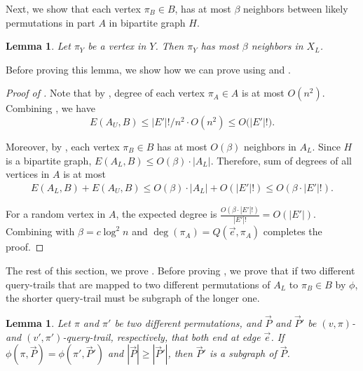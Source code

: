 \documentclass[letterpaper,11pt]{article}
\newtheorem{lemma}[theorem]{Lemma}
\begin{document}
Next, we show that each vertex $\pi_B \in B$, has at most $\beta$ neighbors between likely permutations in part $A$ in bipartite graph $H$.

\begin{lemma}\label{lem: few-likely-neighbors}
Let $\pi_Y$ be a vertex in $Y$. Then $\pi_Y$ has most $\beta$ neighbors in $X_L$. 
\end{lemma}


Before proving this lemma, we show how we can prove  using  and .

\begin{proof}[Proof of ]
Note that by , degree of each vertex $\pi_A \in A$ is at most $O(n^2)$. Combining , we have
$$E(A_U, B) \leq |E'|! / n^2 \cdot O(n^2) \leq O\big(|E'|!).$$


Moreover, by , each vertex $\pi_B \in B$ has at most $O(\beta)$ neighbors in $A_L$. Since $H$ is a bipartite graph,  $E(A_L, B) \leq O(\beta)\cdot |A_L|$. Therefore, sum of degrees of all vertices in $A$ is at most 
\begin{align*}
    E(A_L, B) + E(A_U, B) \leq O(\beta)\cdot|A_L| + O(|E'|!) \leq O(\beta\cdot|E'|!).
\end{align*}

For a random vertex in $A$, the expected degree is $\frac{O(\beta \cdot |E'|!)}{|E'|!} = O(|E'|)$. Combining with $\beta = c\log^2 n$ and $\deg(\pi_A) = Q(\vec{e},\pi_A)$ completes the proof.
\end{proof}




The rest of this section, we prove . Before proving , we prove that if two different query-trails that are mapped to two different permutations of $A_L$ to $\pi_B \in B$ by $\phi$, the shorter query-trail must be subgraph of the longer one.

\begin{lemma}\label{lem:no-branch}
Let $\pi$ and $\pi'$ be two different permutations, and $\vec{P}$ and $\vec{P}'$ be $(v,\pi)$- and $(v',\pi')$-query-trail, respectively, that both end at edge $\vec{e}$. If $\phi(\pi,\vec{P})=\phi(\pi',\vec{P}')$ and $|\vec{P}| \geq |\vec{P}'|$, then $\vec{P}'$ is a subgraph of $\vec{P}$.
\end{lemma}
\end{document}
